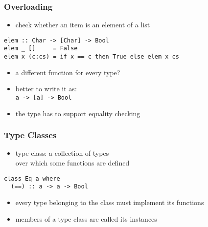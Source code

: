 \documentclass[dvipsnames]{beamer}
\theoremstyle{plain}
\begin{document}
\begin{frame}[fragile]
  \frametitle{Overloading}

  \begin{itemize}
    \item check whether an item is an element of a list
  \end{itemize}

  \begin{exampleblock}{}
    \begin{lstlisting}
elem :: Char -> [Char] -> Bool
elem _ []     = False
elem x (c:cs) = if x == c then True else elem x cs
    \end{lstlisting}
  \end{exampleblock}

  \pause
  \begin{itemize}
    \item a different function for every type?
    \item better to write it as:\\
      \lstinline|a -> [a] -> Bool|
    \item the type has to support equality checking
  \end{itemize}
\end{frame}

\begin{frame}[fragile]
  \frametitle{Type Classes}

  \begin{itemize}
    \item \alert{type class}: a collection of types\\
      over which some functions are defined
  \end{itemize}

  \begin{exampleblock}{}
    \begin{lstlisting}
class Eq a where
  (==) :: a -> a -> Bool
    \end{lstlisting}
  \end{exampleblock}

  \begin{itemize}
    \item every type belonging to the class must implement its functions
    \item members of a type class are called its \alert{instances}
  \end{itemize}
\end{frame}
\end{document}
